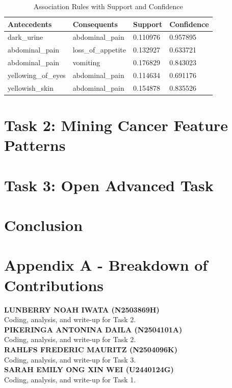 \documentclass[12pt]{article}
\begin{document}
\begin{table}[ht]
\centering
\begin{tabular}{|l|l|l|l|}
\hline
\textbf{Antecedents}        & \textbf{Consequents}       & \textbf{Support} & \textbf{Confidence} \\ \hline
dark\_urine                 & abdominal\_pain            & 0.110976         & 0.957895           \\ \hline
abdominal\_pain             & loss\_of\_appetite         & 0.132927         & 0.633721           \\ \hline
abdominal\_pain             & vomiting                   & 0.176829         & 0.843023           \\ \hline
yellowing\_of\_eyes         & abdominal\_pain            & 0.114634         & 0.691176           \\ \hline
yellowish\_skin             & abdominal\_pain            & 0.154878         & 0.835526           \\ \hline
\end{tabular}
\caption{Association Rules with Support and Confidence}
\end{table} 

\pagebreak
\section{Task 2: Mining Cancer Feature Patterns}

\pagebreak
\section{Task 3: Open Advanced Task}

\pagebreak
\section{Conclusion} %

\pagebreak
\section*{Appendix A - Breakdown of Contributions}
\renewcommand{\thepage}{A-\arabic{page}}

\textbf{LUNBERRY NOAH IWATA (N2503869H)} \\
Coding, analysis, and write-up for Task 2. \\

\textbf{PIKERINGA ANTONINA DAILA (N2504101A)} \\
Coding, analysis, and write-up for Task 2. \\

\textbf{RAHLFS FREDERIC MAURITZ (N2504096K)} \\
Coding, analysis, and write-up for Task 3. \\

\textbf{SARAH EMILY ONG XIN WEI (U2440124G)} \\
Coding, analysis, and write-up for Task 1. \\
\end{document}
